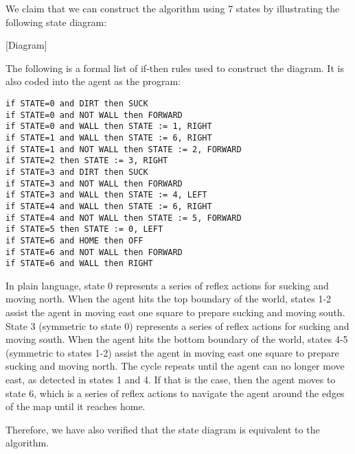 We claim that we can construct the algorithm using 7 states by illustrating the following state diagram:

[Diagram]

The following is a formal list of if-then rules used to construct the diagram. It is also coded into the agent as the program:

\begin{verbatim}
if STATE=0 and DIRT then SUCK
if STATE=0 and NOT WALL then FORWARD
if STATE=0 and WALL then STATE := 1, RIGHT
if STATE=1 and WALL then STATE := 6, RIGHT
if STATE=1 and NOT WALL then STATE := 2, FORWARD
if STATE=2 then STATE := 3, RIGHT
if STATE=3 and DIRT then SUCK
if STATE=3 and NOT WALL then FORWARD
if STATE=3 and WALL then STATE := 4, LEFT
if STATE=4 and WALL then STATE := 6, RIGHT
if STATE=4 and NOT WALL then STATE := 5, FORWARD
if STATE=5 then STATE := 0, LEFT
if STATE=6 and HOME then OFF
if STATE=6 and NOT WALL then FORWARD
if STATE=6 and WALL then RIGHT
\end{verbatim}

In plain language, state 0 represents a series of reflex actions for sucking and moving north. When the agent hits the top boundary of the world, states 1-2 assist the agent in moving east one square to prepare sucking and moving south. State 3 (symmetric to state 0) represents a series of reflex actions for sucking and moving south. When the agent hits the bottom boundary of the world, states 4-5 (symmetric to states 1-2) assist the agent in moving east one square to prepare sucking and moving north. The cycle repeats until the agent can no longer move east, as detected in states 1 and 4. If that is the case, then the agent moves to state 6, which is a series of reflex actions to navigate the agent around the edges of the map until it reaches home.

Therefore, we have also verified that the state diagram is equivalent to the algorithm.

